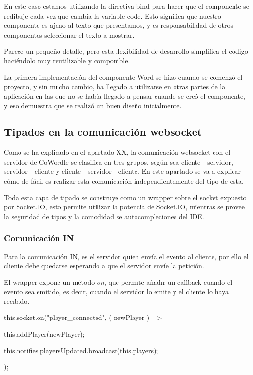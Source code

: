 En este caso estamos utilizando la directiva bind para hacer que el componente se redibuje cada vez que cambia la variable code. Esto significa que nuestro componente es ajeno al texto que presentamos, y es responsabilidad de otros componentes seleccionar el texto a mostrar.

Parece un pequeño detalle, pero esta flexibilidad de desarrollo simplifica el código haciéndolo muy reutilizable y componible.

La primera implementación del componente Word se hizo cuando se comenzó el proyecto,  y sin mucho cambio, ha llegado a utilizarse en otras partes de la aplicación en las que no se había llegado a pensar cuando se creó el componente, y eso demuestra que se realizó un buen diseño inicialmente.

\subsection{Tipados en la comunicación websocket}
Como se ha explicado en el apartado XX, la comunicación websocket con el servidor de CoWordle se clasifica en tres grupos, según sea cliente - servidor, servidor - cliente y cliente - servidor - cliente. En este apartado se va a explicar cómo de fácil es realizar esta comunicación independientemente del tipo de esta.

Toda esta capa de tipado se construye como un wrapper sobre el socket expuesto por Socket.IO, esto permite utilizar la potencia de Socket.IO, mientras se provee la seguridad de tipos y la comodidad se autocompleciones del IDE.

\subsubsection{Comunicación IN}
Para la comunicación IN, es el servidor quien envía el evento al cliente, por ello el cliente debe quedarse esperando a que el servidor envíe la petición.

El wrapper expone un método \textit{on}, que permite añadir un callback cuando el evento sea emitido, es decir, cuando el servidor lo emite y el cliente lo haya recibido.

\begin{mytypescript}[float={!h},caption={Uso de eventos websocket IN.},label={alg:ws_in_usage}]
	this.socket.on("player_connected", ({ newPlayer }) => {
		this.addPlayer(newPlayer);
																																																																		
		this.notifies.playersUpdated.broadcast(this.players);
	}); 
\end{mytypescript}

